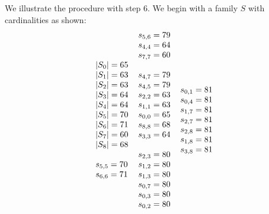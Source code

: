 \documentclass[letterpaper]{article} %
\theoremstyle{definition}
\begin{document}
We illustrate the procedure with step $6$.  We begin with a family $S$ with cardinalities as shown:
\[
\arraycolsep=3.0pt
\begin{array}[t]{lllll}
 \begin{array}{l}
|S_0| = 65 \\
|S_1| = 63 \\
|S_2| = 63 \\
|S_3| = 64 \\
|S_4| = 64 \\
|S_5| = 70 \\
|S_6| = 71 \\
|S_7| = 60 \\
|S_8| = 68 \\
\\
s_{5, 5} = 70 \\
s_{6, 6} = 71 \\
\end{array}
 &
\begin{array}{l}
s_{5, 6} = 79 \\
s_{4, 4} = 64 \\
s_{7, 7} = 60 \\
\\
s_{4, 7} = 79 \\
s_{4, 5} = 79 \\
s_{2, 2} = 63 \\
s_{1, 1} = 63 \\
s_{0, 0} = 65 \\
s_{8, 8} = 68 \\
s_{3, 3} = 64 \\
\\
s_{2, 3} = 80 \\
s_{1, 2} = 80 \\
s_{1, 3} = 80 \\
s_{0, 7} = 80 \\
s_{0, 3} = 80 \\
s_{0, 2} = 80 \\
 \end{array}
&
  \begin{array}{l}
s_{0, 1} = 81 \\
s_{0, 4} = 81 \\
s_{1, 7} = 81 \\
s_{2, 7} = 81 \\
s_{2, 8} = 81 \\
s_{1, 8} = 81 \\
s_{3, 8} = 81 \\

\end{array}
\end{array}\]
\end{document}
